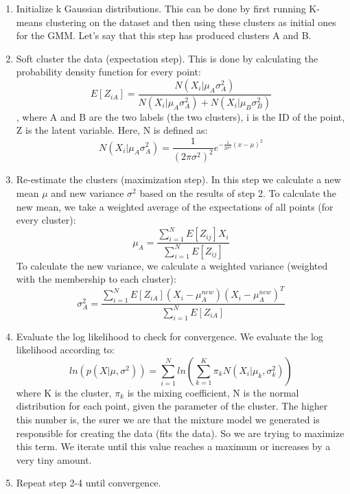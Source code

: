 \documentclass{article}
\begin{document}
\begin{enumerate}
  \item Initialize k Gaussian distributions. This can be done by first running K-means clustering on the dataset and then using these clusters as initial ones for the GMM. Let’s say that this step has produced clusters A and B.
  \item Soft cluster the data (expectation step). This is done by calculating the probability density function for every point:
  \begin{equation}
    E \left[ Z_{iA} \right] = \frac{N(X_i | \mu_A \sigma_{A}^{2})}{N(X_i | \mu_A \sigma_{A}^{2}) + N(X_i | \mu_B \sigma_{B}^{2})}
  \end{equation}
  , where A and B are the two labels (the two clusters), i is the ID of the point, Z is the latent variable. Here, N is defined as:
  \begin{equation}
    N(X_i | \mu_A \sigma_{A}^{2}) = \frac{1}{(2 \pi \sigma^2)^2} e^{-\frac{1}{2 \sigma^2}(x - \mu)^2}
  \end{equation}
  \item Re-estimate the clusters (maximization step). In this step we calculate a new mean $\mu$ and new variance $\sigma^2$ based on the results of step 2. To calculate the new mean, we take a weighted average of the expectations of all points (for every cluster):
  \begin{equation}
    \mu_A = \frac{\sum_{i = 1}^{N} E \left[ Z_{ij} \right] X_i}{\sum_{i = 1}^{N} E \left[ Z_{ij} \right]}
  \end{equation}
  To calculate the new variance, we calculate a weighted variance (weighted with the membership to each cluster):
  \begin{equation}
    \sigma_A^2 = \frac{\sum_{i = 1}^{N} E \left[ Z_{iA} \right] (X_i - \mu_A^{new})(X_i - \mu_A^{new})^T}{\sum_{i = 1}^{N} E \left[ Z_{iA} \right]}
  \end{equation}
  \item Evaluate the log likelihood to check for convergence. We evaluate the log likelihood according to:
  \begin{equation}
    ln(p(X|\mu,\sigma^2)) = \sum_{i = 1}^{N} ln\left( \sum_{k = 1}^{K} \pi_k N(X_i|\mu_k, \sigma_k^2) \right)
  \end{equation}
  where K is the cluster, $\pi_k$ is the mixing coefficient, N is the normal distribution for each point, given the parameter of the cluster. The higher this number is, the surer we are that the mixture model we generated is responsible for creating the data (fits the data). So we are trying to maximize this term. We iterate until this value reaches a maximum or increases by a very tiny amount.
  \item Repeat step 2-4 until convergence.
\end{enumerate}
\end{document}
